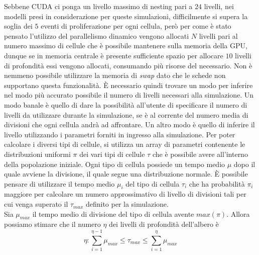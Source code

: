Sebbene CUDA ci ponga un livello massimo di nesting pari a $24$ livelli,
nei modelli presi in considerazione per queste simulazioni, difficilmente
si supera la soglia dei $5$ eventi di proliferazione per ogni cellula,
però per come è stato pensato l'utilizzo del parallelismo dinamico vengono
allocati $N$ livelli pari al numero massimo di cellule che è possibile mantenere
sulla memoria della GPU, dunque se in memoria centrale è presente sufficiente
spazio per allocare $10$ livelli di profondità essi vengono allocati,
consumando più risorse del necessario. Non è nemmeno possibile utilizzare
la memoria di \textit{swap} dato che le schede non supportano questa
funzionalità.
È necessario quindi trovare un modo per inferire nel modo più accurato
possibile il numero di livelli necessari alla simulazione.
Un modo banale è quello di dare la possibilità all'utente di specificare il
numero di livelli da utilizzare durante la simulazione, se è al corrente
del numero media di divisioni che ogni cellula andrà ad affrontare.
Un altro modo è quello di inferire il livello utilizzando i parametri forniti
in ingresso alla simulazione.
Per poter calcolare i diversi tipi di cellule, si utilizza un array di
parametri contenente le distribuzioni uniformi $\pi$ dei vari tipi di cellule
$\tau$ che è possibile avere all'interno della popolazione iniziale.
Ogni tipo di cellula possiede un tempo medio $\mu$ dopo il quale avviene
la divisione, il quale segue una distribuzione normale.
È possibile pensare di utilizzare il tempo medio $\mu_{i}$ del tipo di cellula
$\tau_{i}$ che ha probabilità $\pi_{i}$ maggiore per calcolare un numero
approssimativo di livello di divisioni tali per cui venga superato il
$\tau_{max}$ definito per la simulazione.
\\
Sia $\mu_{max}$ il tempo medio di divisione
del tipo di cellula avente $max(\pi)$.
Allora possiamo stimare che il numero $\eta$ dei livelli di profondità
dell'albero è $$\eta : \sum\limits_{i=1}^{\eta - 1}
\mu_{max} \leqslant \tau_{max} \leqslant \sum\limits_{i=1}^{\eta} \mu_{max}$$

\begin{figure}[H]
    \centering
    \caption{}
\end{figure}

